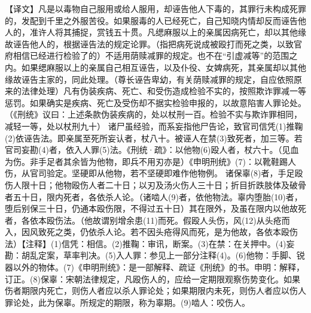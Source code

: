 \documentclass[12pt,UTF8]{ctexbook}
\begin{document}
【译文】凡是以毒物自己服用或给人服用，却诬告他人下毒的，其罪行未构成死罪的，发配到千里之外服苦役。如果服毒的人已经死亡，自己知晓内情却反而诬告他人的，准许人将其捕捉，赏钱五十贯。凡缌麻服以上的亲属因病死亡，却以其他缘故诬告他人的，根据诬告法的规定论罪。（指把病死说成被殴打而死之类，以致官府相信已经进行检验了的）不适用荫赎减罪的规定。也不在“引虚减等”的范围之内。如果缌麻服以上的亲属自己相互诬告，以及仆役、女婢病死，其亲属却以其他缘故诬告主家的，同此处理。（尊长诬告卑幼，有关荫赎减罪的规定，自应依照原来的法律处理）凡有伪装疾病、死亡、和受伤造成检验不实的，按照欺诈罪减一等惩罚。如果确实是疾病、死亡及受伤却不据实检验申报的，以故意陷害人罪论处。（《刑统》议曰：上述条款伪装疾病的，处以杖刑一百。检验不实与欺诈罪相同，减轻一等，处以杖刑九十）
诸尸虽经验，而系妄指他尸告论，致官司信凭(1)推鞠(2)依诬告法。即亲属至死所妄认者，杖八十。被诬人在禁(3)致死者，加三等。若官司妄勘(4)者，依入人罪(5)法。《刑统·疏》：以他物(6)殴人者，杖六十。（见血为伤。非手足者其余皆为他物，即兵不用刃亦是）《申明刑统》(7)：以靴鞋踢人伤，从官司验定。坚硬即从他物，若不坚硬即难作他物例。
诸保辜(8)者，手足殴伤人限十日；他物殴伤人者二十日；以刃及汤火伤人三十日；折目折跌肢体及破骨者五十日，限内死者，各依杀人论。（诸啮人(9)者，依他物法。辜内堕胎(10)者，堕后别保三十日，仍通本殴伤限，不得过五十日）其在限外，及虽在限内以他故死者，各依本殴伤法。（他故谓别增余患(11)而死。假殴人头伤，风(12)从头疮而入，因风致死之类，仍依杀人论。若不因头疮得风而死，是为他故，各依本殴伤法）【注释】(1)信凭：相信。(2)推鞠：审讯，断案。(3)在禁：在关押中。(4)妄勘：胡乱定案，草率判决。(5)入人罪：参见上一部分注释(4)。(6)他物：手脚、锐器以外的物体。(7)《申明刑统》：是一部解释、疏证《刑统》的书。申明：解释，订正。(8)保辜：宋朝法律规定，凡殴伤人的，应给一定期限观察伤势变化。如果伤者期限内死亡，则伤人者应以杀人罪论处；如果期限内未死，则伤人者应以伤人罪论处，此为保辜。所规定的期限，称为辜期。(9)啮人：咬伤人。
\end{document}
